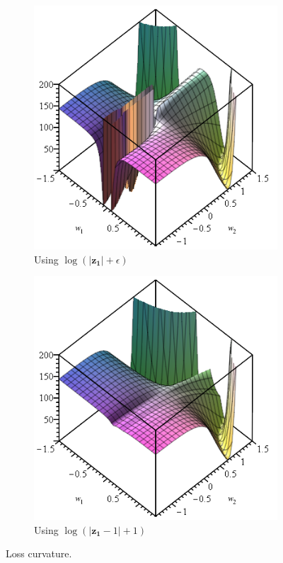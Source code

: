\documentclass[a4paper]{article}
\begin{document}
\begin{figure}[H]
	\centering
\begin{subfigure}{.5\textwidth}
  \centering
  \includegraphics[width=\linewidth]{./graphics/nac-mul-normal-loss.png}
  \caption{Using $\log(|\mathbf{z_1}| + \epsilon)$}
\end{subfigure}%
\begin{subfigure}{.5\textwidth}
  \centering
  \includegraphics[width=\linewidth]{./graphics/nac-mul-safe-loss.png}
  \caption{Using $\log(|\mathbf{z_1} - 1| + 1)$}
\end{subfigure}
	\caption{Loss curvature.}
\end{figure}
\end{document}
